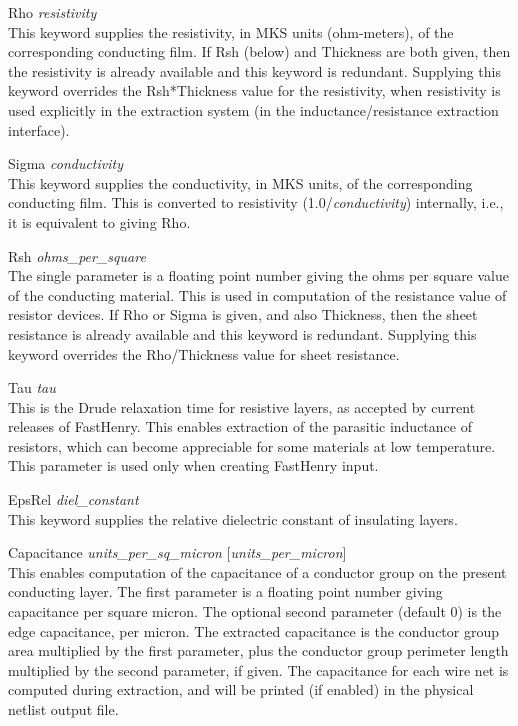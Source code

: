 \begin{description}
\item{\et Rho {\it resistivity}}\\
This keyword supplies the resistivity, in MKS units (ohm-meters), of
the corresponding conducting film.  If {\et Rsh} (below) and {\et
Thickness} are both given, then the resistivity is already available
and this keyword is redundant.  Supplying this keyword overrides the
{\et Rsh}*{\et Thickness} value for the resistivity, when resistivity
is used explicitly in the extraction system (in the
inductance/resistance extraction interface).

\item{\et Sigma {\it conductivity}}\\
This keyword supplies the conductivity, in MKS units, of the
corresponding conducting film.  This is converted to resistivity
(1.0/{\it conductivity\/}) internally, i.e., it is equivalent to
giving {\et Rho}.

\item{\et Rsh {\it ohms\_per\_square}}\\
The single parameter is a floating point number giving the ohms per
square value of the conducting material.  This is used in computation
of the resistance value of resistor devices.  If {\et Rho} or {\et
Sigma} is given, and also {\et Thickness}, then the sheet resistance
is already available and this keyword is redundant.  Supplying this
keyword overrides the {\et Rho}/{\et Thickness} value for sheet
resistance.

\item{\et Tau {\it tau}}\\
This is the Drude relaxation time for resistive layers, as
accepted by current releases of FastHenry.  This enables
extraction of the parasitic inductance of resistors, which can
become appreciable for some materials at low temperature. 
This parameter is used only when creating FastHenry input.

\item{\et EpsRel {\it diel\_constant}}\\
This keyword supplies the relative dielectric constant of insulating
layers.

\item{\et Capacitance {\it units\_per\_sq\_micron}
     [{\it units\_per\_micron}]}\\
This enables computation of the capacitance of a conductor group on
the present conducting layer.  The first parameter is a floating point
number giving capacitance per square micron.  The optional second
parameter (default 0) is the edge capacitance, per micron.  The
extracted capacitance is the conductor group area multiplied by the
first parameter, plus the conductor group perimeter length multiplied
by the second parameter, if given.  The capacitance for each wire net
is computed during extraction, and will be printed (if enabled) in the
physical netlist output file.


\end{description}
